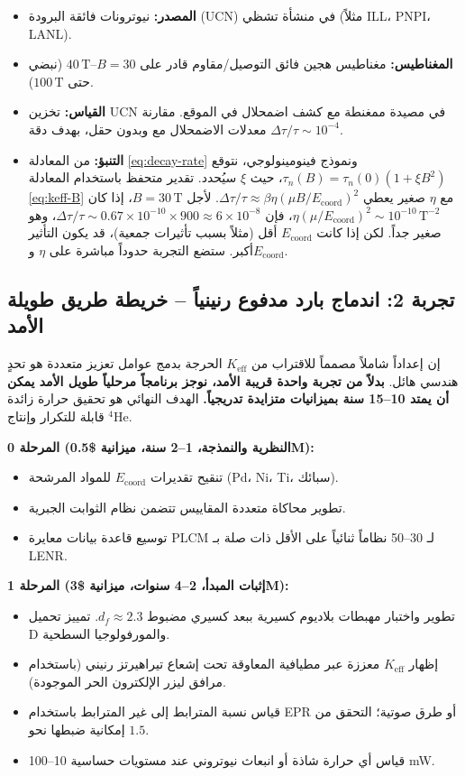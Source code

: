 \documentclass[11pt,a4paper]{article}
\newcommand{\Keff}{K_{\mathrm{eff}}}
\theoremstyle{remark}
\begin{document}
	\begin{itemize}
		\item \textbf{المصدر:} نيوترونات فائقة البرودة (UCN) في منشأة تشظي (مثلاً ILL، PNPI، LANL).
		\item \textbf{المغناطيس:} مغناطيس هجين فائق التوصيل/مقاوم قادر على \(B = 30\)–\(40\,\text{T}\) (نبضي حتى \(100\,\text{T}\)).
		\item \textbf{القياس:} تخزين UCN في مصيدة ممغنطة مع كشف اضمحلال في الموقع. مقارنة معدلات الاضمحلال مع وبدون حقل، بهدف دقة \(\Delta \tau / \tau \sim 10^{-4}\).
		\item \textbf{التنبؤ:} من المعادلة \eqref{eq:decay-rate} ونموذج فينومينولوجي، نتوقع \(\tau_n(B) = \tau_n(0) (1 + \xi B^2)\)، حيث \(\xi\) سيُحدد. تقدير متحفظ باستخدام المعادلة \eqref{eq:keff-B} مع \(\eta\) صغير يعطي \(\Delta \tau/\tau \approx \beta \eta (\mu B/E_{\mathrm{coord}})^2\). لأجل \(B = 30\,\text{T}\)، إذا كان \(\eta (\mu/E_{\mathrm{coord}})^2 \sim 10^{-10}\,\text{T}^{-2}\)، فإن \(\Delta \tau/\tau \sim 0.67 \times 10^{-10} \times 900 \approx 6\times10^{-8}\)، وهو صغير جداً. لكن إذا كانت \(E_{\mathrm{coord}}\) أقل (مثلاً بسبب تأثيرات جمعية)، قد يكون التأثير أكبر. ستضع التجربة حدوداً مباشرة على \(\eta\) و\(E_{\mathrm{coord}}\).
	\end{itemize}
	
	\subsection{تجربة 2: اندماج بارد مدفوع رنينياً – خريطة طريق طويلة الأمد}
	
	إن إعداداً شاملاً مصمماً للاقتراب من \(\Keff\) الحرجة بدمج عوامل تعزيز متعددة هو تحدٍ هندسي هائل. \textbf{بدلاً من تجربة واحدة قريبة الأمد، نوجز برنامجاً مرحلياً طويل الأمد يمكن أن يمتد 10–15 سنة بميزانيات متزايدة تدريجياً.} الهدف النهائي هو تحقيق حرارة زائدة قابلة للتكرار وإنتاج \(^4\)He.
	
	\textbf{المرحلة 0 (النظرية والنمذجة، 1–2 سنة، ميزانية \$0.5M):}
	\begin{itemize}
		\item تنقيح تقديرات \(E_{\mathrm{coord}}\) للمواد المرشحة (Pd، Ni، Ti، سبائك).
		\item تطوير محاكاة متعددة المقاييس تتضمن نظام الثوابت الجبرية.
		\item توسيع قاعدة بيانات معايرة PLCM لـ 30–50 نظاماً ثنائياً على الأقل ذات صلة بـ LENR.
	\end{itemize}
	
	\textbf{المرحلة 1 (إثبات المبدأ، 2–4 سنوات، ميزانية \$3M):}
	\begin{itemize}
		\item تطوير واختبار مهبطات بلاديوم كسيرية ببعد كسيري مضبوط \(d_f \approx 2.3\). تمييز تحميل D والمورفولوجيا السطحية.
		\item إظهار \(\Keff\) معززة عبر مطيافية المعاوقة تحت إشعاع تيراهيرتز رنيني (باستخدام مرافق ليزر الإلكترون الحر الموجودة).
		\item قياس نسبة المترابط إلى غير المترابط باستخدام EPR أو طرق صوتية؛ التحقق من إمكانية ضبطها نحو \(1.5\).
		\item قياس أي حرارة شاذة أو انبعاث نيوتروني عند مستويات حساسية 10–100 mW.
	\end{itemize}
	
\end{document}

